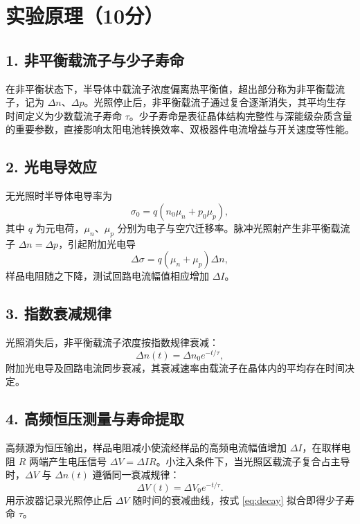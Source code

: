 \documentclass[12pt,a4paper]{ctexart}
\begin{document}
\section*{实验原理（10分）}

\subsection*{1. 非平衡载流子与少子寿命}
在非平衡状态下，半导体中载流子浓度偏离热平衡值，超出部分称为非平衡载流子，记为 $\Delta n$、$\Delta p$。光照停止后，非平衡载流子通过复合逐渐消失，其平均生存时间定义为少数载流子寿命 $\tau$。少子寿命是表征晶体结构完整性与深能级杂质含量的重要参数，直接影响太阳电池转换效率、双极器件电流增益与开关速度等性能。

\subsection*{2. 光电导效应}
无光照时半导体电导率为
\begin{equation}
    \sigma_0 = q(n_0\mu_n + p_0\mu_p),
\end{equation}
其中 $q$ 为元电荷，$\mu_n$、$\mu_p$ 分别为电子与空穴迁移率。脉冲光照射产生非平衡载流子 $\Delta n = \Delta p$，引起附加光电导
\begin{equation}
    \Delta\sigma = q(\mu_n + \mu_p)\Delta n,
\end{equation}
样品电阻随之下降，测试回路电流幅值相应增加 $\Delta I$。

\subsection*{3. 指数衰减规律}
光照消失后，非平衡载流子浓度按指数规律衰减：
\begin{equation}
    \Delta n(t) = \Delta n_0 e^{-t/\tau},
\end{equation}
附加光电导及回路电流同步衰减，其衰减速率由载流子在晶体内的平均存在时间决定。

\subsection*{4. 高频恒压测量与寿命提取}
高频源为恒压输出，样品电阻减小使流经样品的高频电流幅值增加 $\Delta I$，在取样电阻 $R$ 两端产生电压信号 $\Delta V = \Delta I R$。小注入条件下，当光照区载流子复合占主导时，$\Delta V$ 与 $\Delta n(t)$ 遵循同一衰减规律：
\begin{equation}
    \Delta V(t) = \Delta V_0 e^{-t/\tau}.
    \label{eq:decay}
\end{equation}
用示波器记录光照停止后 $\Delta V$ 随时间的衰减曲线，按式 \eqref{eq:decay} 拟合即得少子寿命 $\tau$。
\end{document}
